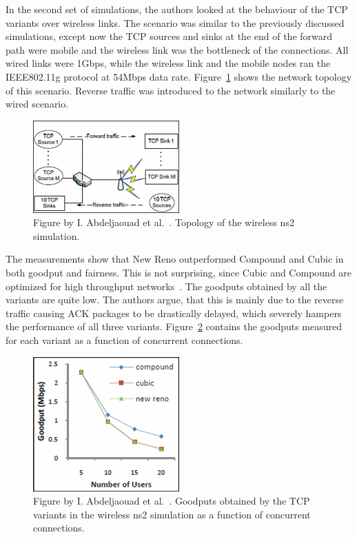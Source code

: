 In the second set of simulations, the authors looked at the behaviour of the TCP variants over wireless links. The scenario was similar to the previously discussed simulations, except now the TCP sources and sinks at the end of the forward path were mobile and the wireless link was the bottleneck of the connections. All wired links were 1Gbps, while the wireless link and the mobile nodes ran the IEEE802.11g protocol at 54Mbps data rate. Figure~\ref{fig:topology3} shows the network topology of this scenario. Reverse traffic was introduced to the network similarly to the wired scenario.     

\begin{figure}
	\includegraphics[width=0.5\textwidth]{images/abdeljaouad10_topology_3.png}
	\caption{Figure by I. Abdeljaouad et al.~\cite{Abdeljaouad10}. Topology of the wireless ns2 simulation.}
	\label{fig:topology3}
\end{figure}

The measurements show that New Reno outperformed Compound and Cubic in both goodput and fairness. This is not surprising, since Cubic and Compound are optimized for high throughput networks~\cite{Ha08,Tan05}. The goodputs obtained by all the variants are quite low. The authors argue, that this is mainly due to the reverse traffic causing ACK packages to be drastically delayed, which severely hampers the performance of all three variants. Figure~\ref{fig:goodput} contains the goodputs measured for each variant as a function of concurrent connections.

\begin{figure}
	\includegraphics[width=0.5\textwidth]{images/abdeljaouad10_goodput.png}
	\caption{Figure by I. Abdeljaouad et al.~\cite{Abdeljaouad10}. Goodputs obtained by the TCP variants in the wireless ns2 simulation as a function of concurrent connections. }
	\label{fig:goodput}
\end{figure}

